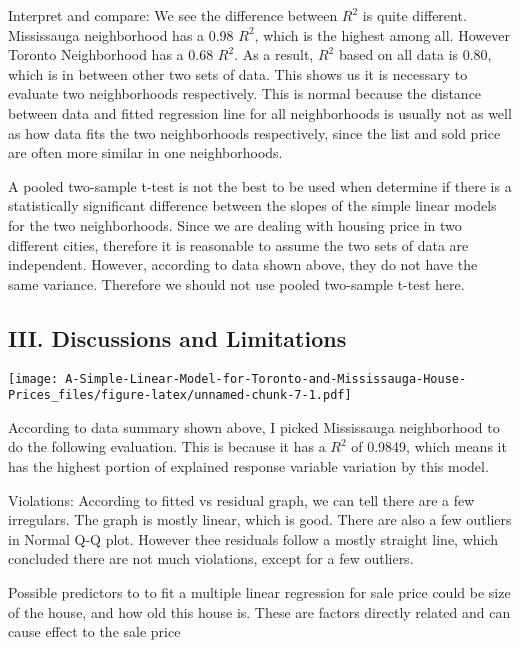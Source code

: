 \documentclass[
]{article}
\begin{document}
Interpret and compare: We see the difference between \(R^2\) is quite
different. Mississauga neighborhood has a 0.98 \(R^2\), which is the
highest among all. However Toronto Neighborhood has a 0.68 \(R^2\). As a
result, \(R^2\) based on all data is 0.80, which is in between other two
sets of data. This shows us it is necessary to evaluate two
neighborhoods respectively. This is normal because the distance between
data and fitted regression line for all neighborhoods is usually not as
well as how data fits the two neighborhoods respectively, since the list
and sold price are often more similar in one neighborhoods.

A pooled two-sample t-test is not the best to be used when determine if
there is a statistically significant difference between the slopes of
the simple linear models for the two neighborhoods. Since we are dealing
with housing price in two different cities, therefore it is reasonable
to assume the two sets of data are independent. However, according to
data shown above, they do not have the same variance. Therefore we
should not use pooled two-sample t-test here.

\hypertarget{iii.-discussions-and-limitations}{%
\subsection{III. Discussions and
Limitations}\label{iii.-discussions-and-limitations}}

\texttt{[image: A-Simple-Linear-Model-for-Toronto-and-Mississauga-House-Prices\_files/figure-latex/unnamed-chunk-7-1.pdf]}

According to data summary shown above, I picked Mississauga neighborhood
to do the following evaluation. This is because it has a \(R^2\) of
0.9849, which means it has the highest portion of explained response
variable variation by this model.

Violations: According to fitted vs residual graph, we can tell there are
a few irregulars. The graph is mostly linear, which is good. There are
also a few outliers in Normal Q-Q plot. However thee residuals follow a
mostly straight line, which concluded there are not much violations,
except for a few outliers.

Possible predictors to to fit a multiple linear regression for sale
price could be size of the house, and how old this house is. These are
factors directly related and can cause effect to the sale price
\end{document}
